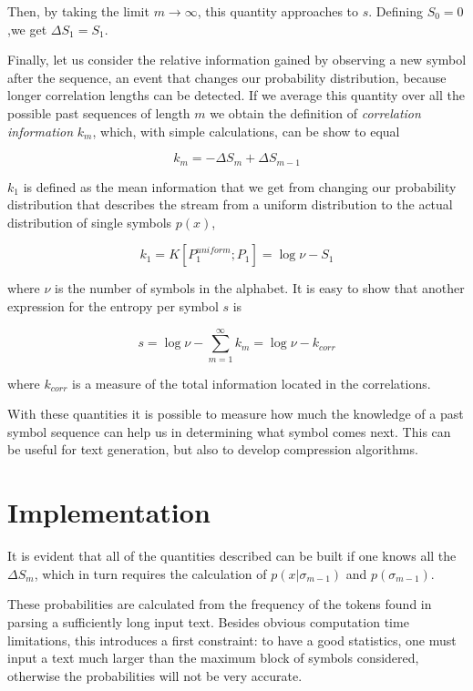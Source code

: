 \documentclass[conference]{IEEEtran}
\begin{document}
Then, by taking the limit $m\rightarrow\infty$, this quantity approaches to $s$. Defining $S_0 = 0$,we get $\Delta S_1 = S_1$.

Finally, let us consider the relative information gained by observing a new symbol after the sequence, an event that changes our probability distribution, because longer correlation lengths can be detected. If we average this quantity over all the possible past sequences of length $m$ we obtain the definition of \emph{correlation information} $k_m$, which, with simple calculations, can be show to equal

\begin{dmath}
k_m = -\Delta S_m + \Delta S_{m-1}
\end{dmath}

$k_1$ is defined as the mean information that we get from changing our probability distribution that describes the stream from a uniform distribution to the actual distribution of single symbols $p(x)$,

\begin{dmath}
k_1 = K[P_1^{uniform}; P_1] = \log \nu - S_1
\end{dmath}

where $\nu$ is the number of symbols in the alphabet. It is easy to show that another expression for the entropy per symbol $s$ is

\begin{dmath}
s = \log \nu - \sum_{m=1}^\infty k_m = \log \nu - k_{corr}
\end{dmath}

where $k_{corr}$ is a measure of the total information located in the correlations.

With these quantities it is possible to measure how much the knowledge of a past symbol sequence can help us in determining what symbol comes next. This can be useful for text generation, but also to develop compression algorithms.

\section{Implementation}

It is evident that all of the quantities described can be built if one knows all the $\Delta S_m$, which in turn requires the calculation of $p(x|\sigma_{m-1})$ and $p(\sigma_{m-1})$.

These probabilities are calculated from the frequency of the tokens found in parsing a sufficiently long input text. Besides obvious computation time limitations, this introduces a first constraint: to have a good statistics, one must input a text much larger than the maximum block of symbols considered, otherwise the probabilities will not be very accurate.
\end{document}
